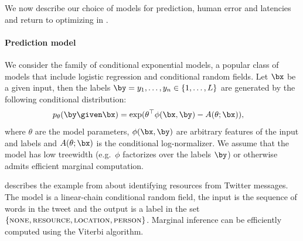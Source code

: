We now describe our choice of models for prediction, human error and latencies and return to optimizing  in .



\paragraph{Prediction model}
We consider the family of conditional exponential models, a popular class of models that include logistic regression and conditional random fields.
Let $\bx$ be a given input, then the labels $\by = y_1, \ldots, y_n \in \{1, \dots, L\}$ are generated by the following conditional distribution:
\begin{align*}
  \p(\by \given \bx) 
  &= \exp( \theta^\top \phi(\bx, \by) - A(\theta; \bx)),
\end{align*}
where $\theta$ are the model parameters,
$\phi(\bx, \by)$ are arbitrary features of the input and labels and 
$A(\theta; \bx)$ is the conditional log-normalizer.
We assume that the model has low treewidth (e.g.\ $\phi$ factorizes over the labels $\by$) or otherwise admits efficient marginal computation.

 describes the example from  about identifying resources 
from Twitter messages. The model is a linear-chain conditional random field, the input is the sequence of words in the tweet and the output is a label in the set $\{\textsc{none}, \textsc{resource},  \textsc{location}, \textsc{person}\}$. Marginal inference can be efficiently computed using the Viterbi algorithm.


